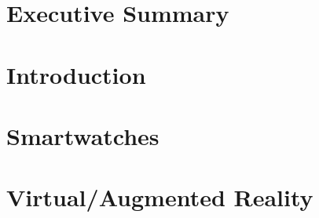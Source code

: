 \documentclass[12pt, titlepage, onecolumn]{article}
\begin{document}
\begin{titlepage}

\end{titlepage}
\frontmatter
\section*{Executive Summary}

\clearpage
\begin{singlespace}
\tableofcontents
\clearpage
\end{singlespace}
\clearpage
\setlength{\parindent}{0em}
\setlength{\parskip}{1em}
\mainmatter

\section{Introduction}


\clearpage
\section{Smartwatches}


\clearpage
\section{Virtual/Augmented Reality}

\clearpage
\backmatter
\begin{singlespace}
    



\clearpage
\end{singlespace}
\end{document}
